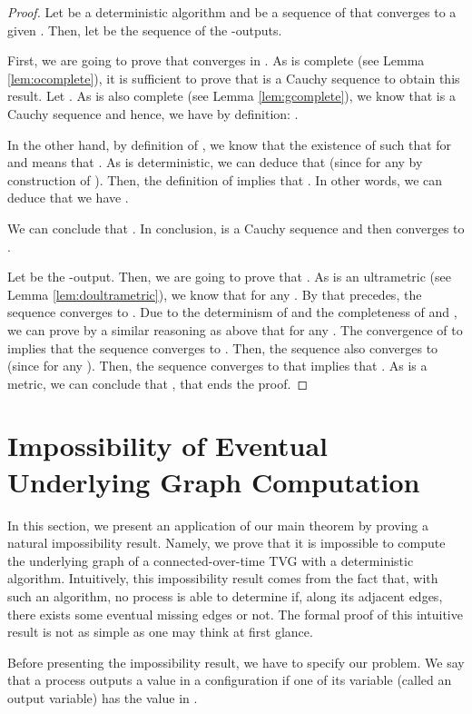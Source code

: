 \documentclass[11pt]{article}
\begin{document}
\begin{proof}
Let  be a deterministic algorithm and  be a sequence of  that converges to a given . Then, let  be the sequence of the -outputs.

First, we are going to prove that  converges in . As  is complete (see Lemma \ref{lem:ocomplete}), it is sufficient to prove that  is a Cauchy sequence to obtain this result. Let . As  is also complete (see Lemma \ref{lem:gcomplete}), we know that  is a Cauchy sequence and hence, we have by definition: . 

In the other hand, by definition of , we know that the existence of  such that  for  and  means that . As  is deterministic, we can deduce that  (since  for any  by construction of ). Then, the definition of  implies that . In other words, we can deduce that we have .

We can conclude that . In conclusion,  is a Cauchy sequence and then converges to .

Let  be the -output. Then, we are going to prove that . As  is an ultrametric (see Lemma \ref{lem:doultrametric}), we know that  for any . By that precedes, the sequence  converges to . Due to the determinism of  and the completeness of  and , we can prove by a similar reasoning as above that  for any . The convergence of  to  implies that the sequence  converges to . Then, the sequence  also converges to  (since  for any ). Then, the sequence  converges to  that implies that . As  is a metric, we can conclude that , that ends the proof.
\end{proof}

\section{Impossibility of Eventual Underlying Graph Computation \label{sec:COT}}

In this section, we present an application of our main theorem by proving a natural impossibility result. Namely, we prove that it is impossible to compute the underlying graph of a connected-over-time TVG with a deterministic algorithm. Intuitively, this impossibility result comes from the fact that, with such an algorithm, no process is able to determine if, along its adjacent edges, there exists some eventual missing edges or not. The formal proof of this intuitive result is not as simple as one may think at first glance. 

Before presenting the impossibility result, we have to specify our problem. We say that a process  outputs a value  in a configuration  if one of its variable (called an output variable) has the value  in .
\end{document}
